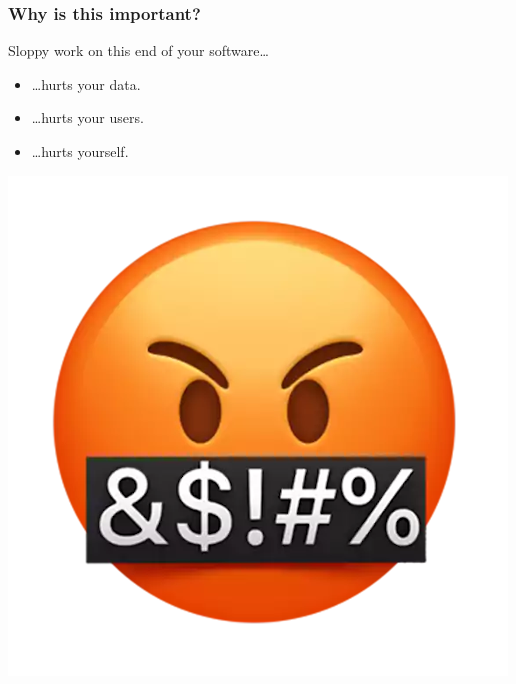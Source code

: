 \documentclass[aspectratio=169,x11names]{beamer}
\begin{document}
\begin{frame}
\frametitle{Why is this important?}
\begin{minipage}{0.55\textwidth}
\large
Sloppy work on this end of your software\dots
\bigskip
\begin{itemize}
\item\dots hurts your data.
\item\dots hurts your users.
\item\dots hurts yourself.
\end{itemize}
\end{minipage}%
\begin{minipage}{0.45\textwidth}
\begin{center}
\includegraphics[scale=0.25]{images/curses.png} 
\end{center}
\end{minipage}
\end{frame}
\end{document}
